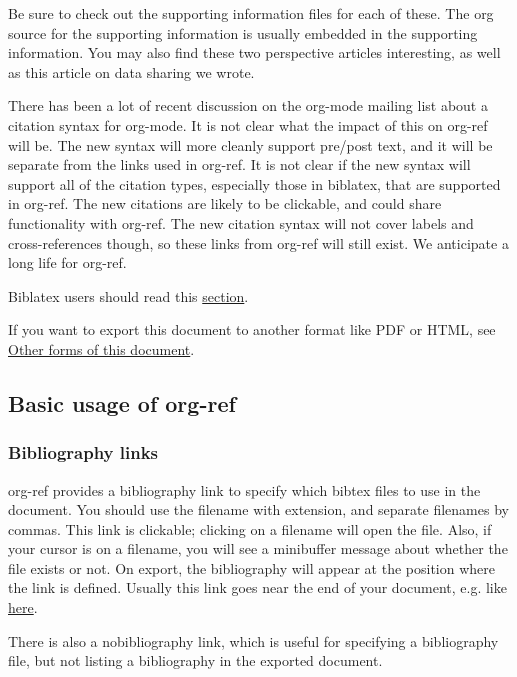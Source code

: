 \documentclass[11pt]{article}
\begin{document}
Be sure to check out the supporting information files for each of these. The org source for the supporting information is usually embedded in the supporting information. You may also find these two perspective articles \cite{kitchin-2015-examp,kitchin-2015-data-surfac-scien} interesting, as well as this article on data sharing \cite{kitchin-2016-autom-data} we wrote.

There has been a lot of recent discussion on the org-mode mailing list about a citation syntax for org-mode. It is not clear what the impact of this on org-ref will be. The new syntax will more cleanly support pre/post text, and it will be separate from the links used in org-ref. It is not clear if the new syntax will support all of the citation types, especially those in biblatex, that are supported in org-ref. The new citations are likely to be clickable, and could share functionality with org-ref. The new citation syntax will not cover labels and cross-references though, so these links from org-ref will still exist. We anticipate a long life for org-ref.

Biblatex users should read this \hyperref[sec:org8aed75f]{section}.

If you want to export this document to another format like PDF or HTML, see \hyperref[sec:orgcccb772]{Other forms of this document}.

\subsection{Basic usage of org-ref}
\label{sec:orgcf39bd5}

\subsubsection{Bibliography links}
\label{sec:org41118c8}
 

org-ref provides a bibliography link to specify which bibtex files to use in the document. You should use the filename with extension, and separate filenames by commas. This link is clickable; clicking on a filename will open the file. Also, if your cursor is on a filename, you will see a minibuffer message about whether the file exists or not. On export, the bibliography will appear at the position where the link is defined. Usually this link goes near the end of your document, e.g. like \hyperref[org512c9b8]{here}.

There is also a nobibliography link, which is useful for specifying a bibliography file, but not listing a bibliography in the exported document.
\end{document}
